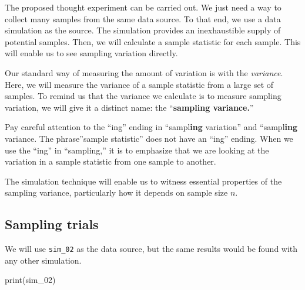 \documentclass[
  letterpaper,
  DIV=11,
  numbers=noendperiod,
  oneside]{scrartcl}
\newenvironment{Shaded}{\begin{snugshade}}{\end{snugshade}}
\newcommand{\FunctionTok}[1]{\textcolor[rgb]{0.28,0.35,0.67}{#1}}
\newcommand{\NormalTok}[1]{\textcolor[rgb]{0.00,0.23,0.31}{#1}}
\begin{document}
The proposed thought experiment can be carried out. We just need a way
to collect many samples from the same data source. To that end, we use a
data simulation as the source. The simulation provides an inexhaustible
supply of potential samples. Then, we will calculate a sample statistic
for each sample. This will enable us to see sampling variation directly.

Our standard way of measuring the amount of variation is with the
\emph{variance}. Here, we will measure the variance of a sample
statistic from a large set of samples. To remind us that the variance we
calculate is to measure sampling variation, we will give it a distinct
name: the ``\textbf{sampling variance.}''

\begin{tcolorbox}[enhanced jigsaw, colbacktitle=quarto-callout-warning-color!10!white, opacityback=0, breakable, opacitybacktitle=0.6, colback=white, coltitle=black, arc=.35mm, title=\textcolor{quarto-callout-warning-color}{\faExclamationTriangle}\hspace{0.5em}{The \textbf{ing} in sampl\emph{ing}}, left=2mm, colframe=quarto-callout-warning-color-frame, rightrule=.15mm, bottomrule=.15mm, leftrule=.75mm, bottomtitle=1mm, toptitle=1mm, titlerule=0mm, toprule=.15mm]

Pay careful attention to the ``ing'' ending in ``sampl\textbf{ing}
variation'' and ``sampl\textbf{ing} variance. The phrase''sample
statistic'' does not have an ``ing'' ending. When we use the ``ing'' in
``sampling,'' it is to emphasize that we are looking at the variation in
a sample statistic from one sample to another.

\end{tcolorbox}

The simulation technique will enable us to witness essential properties
of the sampling variance, particularly how it depends on sample size
\(n\).

\subsection{Sampling trials}\label{sampling-trials}

We will use \texttt{sim\_02} as the data source, but the same results
would be found with any other simulation.

\begin{Shaded}
\begin{Highlighting}[]
\FunctionTok{print}\NormalTok{(sim\_02)}
\end{Highlighting}
\end{Shaded}
\end{document}
